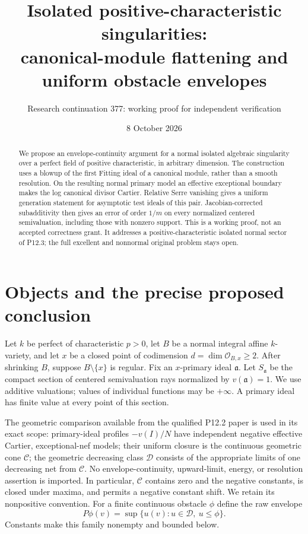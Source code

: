 \documentclass[11pt]{article}
\title{Isolated positive-characteristic singularities:\\
canonical-module flattening and uniform obstacle envelopes}
\author{Research continuation 377: working proof for independent verification}
\date{8 October 2026}
\newcommand{\OO}{\mathcal O}
\newcommand{\CC}{\mathcal C}
\newcommand{\DD}{\mathcal D}
\begin{document}
\maketitle
\begin{abstract}
We propose an envelope-continuity argument for a normal isolated algebraic
singularity over a perfect field of positive characteristic, in arbitrary
dimension. The construction uses a blowup of the first Fitting ideal of a
canonical module, rather than a smooth resolution. On the resulting normal
primary model an effective exceptional boundary makes the log canonical
divisor Cartier. Relative Serre vanishing gives a uniform generation statement
for asymptotic test ideals of this pair. Jacobian-corrected subadditivity then
gives an error of order $1/m$ on every normalized centered semivaluation,
including those with nonzero support. This is a working proof, not an accepted
correctness grant. It addresses a positive-characteristic isolated normal
sector of P12.3; the full excellent and nonnormal original problem stays open.
\end{abstract}

\section{Objects and the precise proposed conclusion}
Let $k$ be perfect of characteristic $p>0$, let $B$ be a normal integral
affine $k$-variety, and let $x$ be a closed point of codimension
$d=\dim\OO_{B,x}\geq2$. After shrinking $B$, suppose $B\setminus\{x\}$ is
regular. Fix an $x$-primary ideal $\mathfrak a$. Let
$S_{\mathfrak a}$ be the compact section of centered semivaluation rays
normalized by $v(\mathfrak a)=1$. We use additive valuations; values of
individual functions may be $+\infty$. A primary ideal has finite value
at every point of this section.

The geometric comparison available from the qualified P12.2 paper is used
in its exact scope: primary-ideal profiles
$-v(I)/N$ have independent negative effective Cartier, exceptional-nef
models; their uniform closure is the continuous geometric cone $\CC$;
the geometric decreasing class $\DD$ consists of the appropriate limits
of one decreasing net from $\CC$. No envelope-continuity, upward-limit,
energy, or resolution assertion is imported. In particular,
$\CC$ contains zero and the negative constants, is closed under maxima,
and permits a negative constant shift. We retain its nonpositive convention.
For a finite continuous obstacle $\phi$ define the raw envelope
\[
 P\phi(v)=\sup\{u(v):u\in\DD,\ u\leq\phi\}.
\]
Constants make this family nonempty and bounded below.
\end{document}

